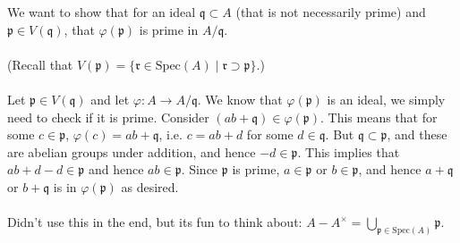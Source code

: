 \documentclass[a4paper]{amsart}
\begin{document}
\begin{itemize}
\begin{itemize}
            We want to show that for an ideal $\mathfrak{q}\subset A$ (that is not necessarily prime) and $\mathfrak{p}\in V(\mathfrak{q})$, that $\varphi(\mathfrak{p})$ is prime in $A/\mathfrak{q}$.
            \\
            \\
            (Recall that $V(\mathfrak{p})=\{\mathfrak{r}\in\text{Spec}(A)\mid \mathfrak{r}\supset \mathfrak{p}\}$.)
            \\
            \\
            Let $\mathfrak{p}\in V(\mathfrak{q})$ and let $\varphi:A\to A/\mathfrak{q}$. We know that $\varphi(\mathfrak{p})$ is an ideal, we simply need to check if it is prime. Consider $(ab+\mathfrak{q})\in \varphi(\mathfrak{p})$. This means that for some $c\in \mathfrak{p}$, $\varphi(c)=ab+\mathfrak{q}$, i.e. $c=ab+d$ for some $d\in \mathfrak{q}$. But $\mathfrak{q}\subset \mathfrak{p}$, and these are abelian groups under addition, and hence $-d\in\mathfrak{p}$. This implies that $ab+d-d\in\mathfrak{p}$ and hence $ab\in\mathfrak{p}$. Since $\mathfrak{p}$ is prime, $a\in\mathfrak{p}$ or $b\in \mathfrak{p}$, and hence $a+\mathfrak{q}$ or $b+\mathfrak{q}$ is in $\varphi(\mathfrak{p})$ as desired.
            \\
            \\
            Didn't use this in the end, but its fun to think about: $A-A^\times = \bigcup_{\mathfrak{p}\in\text{Spec}(A)} \mathfrak{p}$.
    \end{itemize}
\end{itemize}
\end{document}
